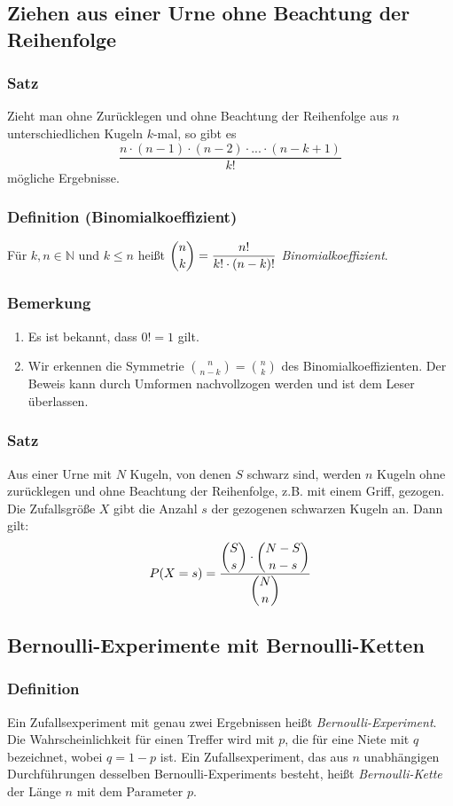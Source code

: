 \documentclass[a4paper,12pt]{article}
\newcommand{\N}{\mathbb{N}}
\begin{document}
\subsection{Ziehen aus einer Urne ohne Beachtung der Reihenfolge}
\subsubsection{Satz}
Zieht man ohne Zurücklegen und ohne Beachtung der Reihenfolge aus $n$ unterschiedlichen Kugeln $k$-mal, so gibt es \[ \dfrac{n\cdot (n-1)\cdot (n-2) \cdot ... \cdot (n-k+1)}{k!} \] mögliche Ergebnisse.

\subsubsection{Definition (Binomialkoeffizient)}
Für $k, n \in \N$ und $k\leq n$ heißt $ \dbinom{n}{k} = \dfrac{n!}{k! \cdot (n-k)!}$ \emph{Binomialkoeffizient}.

\subsubsection{Bemerkung}
\begin{enumerate}[(1)]
\item Es ist bekannt, dass $0!=1$ gilt.
\item Wir erkennen die Symmetrie $\binom{n}{n-k}=\binom{n}{k}$ des Binomialkoeffizienten. Der Beweis kann durch Umformen nachvollzogen werden und ist dem Leser überlassen.
\end{enumerate}

\subsubsection{Satz}
Aus einer Urne mit $N$ Kugeln, von denen $S$ schwarz sind, werden $n$ Kugeln ohne zurücklegen und ohne Beachtung der Reihenfolge, z.B. mit einem Griff, gezogen. Die Zufallsgröße $X$ gibt die Anzahl $s$ der gezogenen schwarzen Kugeln an.  Dann gilt: 
\[ 
P(X=s)=\dfrac{\dbinom{S}{s}\cdot \dbinom{N-S}{n-s}}{\dbinom{N}{n}}
\]


\subsection{Bernoulli-Experimente mit Bernoulli-Ketten}
\subsubsection{Definition}
Ein Zufallsexperiment mit genau zwei Ergebnissen heißt \emph{Bernoulli-Experiment}. Die Wahrscheinlichkeit für einen Treffer wird mit $p$, die für eine Niete mit $q$ bezeichnet, wobei $q=1-p$ ist. Ein Zufallsexperiment, das aus $n$ unabhängigen Durchführungen desselben Bernoulli-Experiments besteht, heißt \emph{Bernoulli-Kette} der Länge $n$ mit dem Parameter $p$. 
\end{document}
